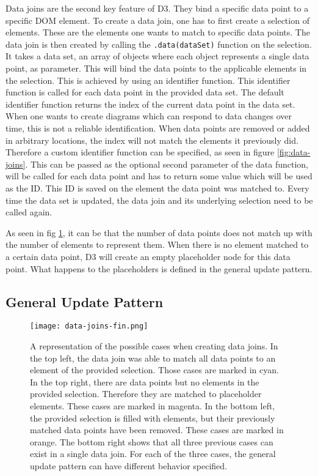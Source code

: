 Data joins are the second key feature of D3. They bind a specific data point to a specific DOM element. To create a data join, one has to first create a selection of elements. These are the elements one wants to match to specific data points. The data join is then created by calling the \texttt{.data(dataSet)} function on the selection. It takes a data set, an array of objects where each object represents a single data point, as parameter. This will bind the data points to the applicable elements in the selection. This is achieved by using an identifier function. This identifier function is called for each data point in the provided data set. The default identifier function returns the index of the current data point in the data set. When one wants to create diagrams which can respond to data changes over time, this is not a reliable identification. When data points are removed or added in arbitrary locations, the index will not match the elements it previously did. Therefore a custom identifier function can be specified, as seen in figure \ref{fig:data-joins}. This can be passed as the optional second parameter of the data function, will be called for each data point and has to return some value which will be used as the ID. This ID is saved on the element the data point was matched to. Every time the data set is updated, the data join and its underlying selection need to be called again.

As seen in fig \ref{fig:general-update-pattern}, it can be that the number of data points does not match up with the number of elements to represent them. When there is no element matched to a certain data point, D3 will create an empty placeholder node for this data point. What happens to the placeholders is defined in the general update pattern.


\subsection{General Update Pattern}

\begin{figure}
    \texttt{[image: data-joins-fin.png]}
    \captionsetup{width=0.9\textwidth}
    \caption[general-update-pattern]{A representation of the possible cases when creating data joins. In the top left, the data join was able to match all data points to an element of the provided selection. Those cases are marked in cyan. In the top right, there are data points but no elements in the provided selection. Therefore they are matched to placeholder elements. These cases are marked in magenta. In the bottom left, the provided selection is filled with elements, but their previously matched data points have been removed. These cases are marked in orange. The bottom right shows that all three previous cases can exist in a single data join. For each of the three cases, the general update pattern can have different behavior specified.}
    \label{fig:general-update-pattern}
\end{figure}

